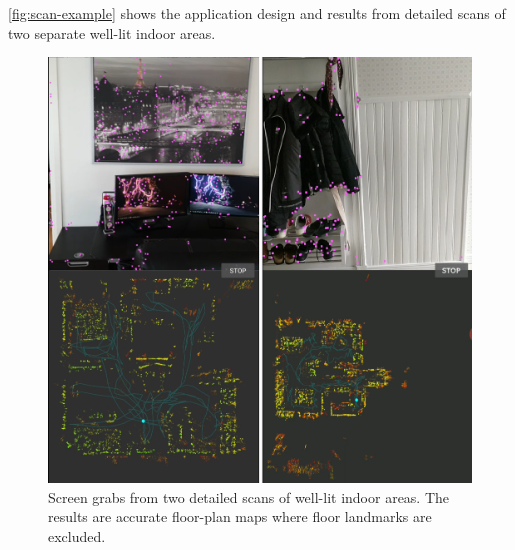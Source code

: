\documentclass{article}
\begin{document}
\autoref{fig:scan-example} shows the application design and results from detailed scans of two separate well-lit indoor areas.

\begin{figure}[!htb]
    \centering
    \includegraphics[width=0.6\linewidth]{scan-example.png}
    \caption{Screen grabs from two detailed scans of well-lit indoor areas. The results are accurate floor-plan maps where floor landmarks are excluded.}
    \label{fig:scan-example}
\end{figure}

\newpage
\end{document}
